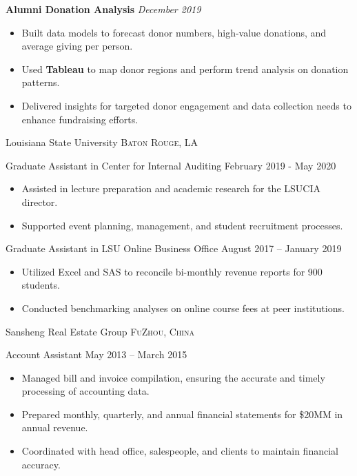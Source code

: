 \documentclass[10pt,a4paper]{article}
\begin{document}
\headedsection
{\textbf{Alumni Donation Analysis}}
{{\hfill\emph{December 2019}}}
  {
    {
      \begin{itemize}
        \item Built data models to forecast donor numbers, high-value donations, and average giving per person.
        \item Used \textbf{Tableau} to map donor regions and perform trend analysis on donation patterns.
        \item Delivered insights for targeted donor engagement and data collection needs to enhance fundraising efforts.
      \end{itemize}
    }
  }

\spacedhrule{0em}{-1em}


\headedsection
{Louisiana State University}
{{\small \textsc{Baton Rouge, LA}}}
{
  \headedsubsection
  {Graduate Assistant in Center for Internal Auditing}
  {February 2019 - May 2020}
  {
    \begin{itemize}
      \item Assisted in lecture preparation and academic research for the LSUCIA director.
      \item Supported event planning, management, and student recruitment processes.
    \end{itemize}
  }
  \headedsubsection
  {Graduate Assistant in LSU Online Business Office}
  {August 2017 – January 2019}
  {
    \begin{itemize}
      \item Utilized Excel and SAS to reconcile bi-monthly revenue reports for 900 students.
      \item Conducted benchmarking analyses on online course fees at peer institutions.
    \end{itemize}
  }
}

\headedsection
{Sansheng Real Estate Group}
{{\small \textsc{FuZhou, China}}}
{
  \headedsubsection
  {Account Assistant}
  {May 2013 – March 2015}
  {
    \begin{itemize}
      \item Managed bill and invoice compilation, ensuring the accurate and timely processing of accounting data.
      \item Prepared monthly, quarterly, and annual financial statements for \$20MM in annual revenue.
      \item Coordinated with head office, salespeople, and clients to maintain financial accuracy.
    \end{itemize}
  }
}
\end{document}
